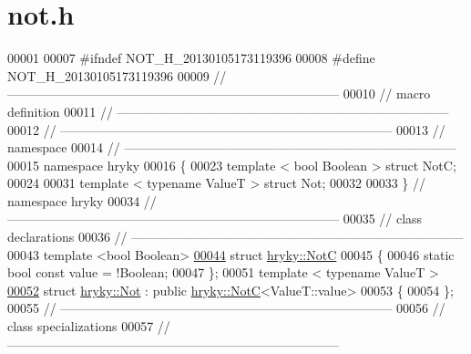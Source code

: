\hypertarget{not_8h_source}{\section{not.\-h}
}

\begin{DoxyCode}
00001 
00007 \textcolor{preprocessor}{#ifndef NOT\_H\_20130105173119396}
00008 \textcolor{preprocessor}{}\textcolor{preprocessor}{#define NOT\_H\_20130105173119396}
00009 \textcolor{preprocessor}{}\textcolor{comment}{//
      ------------------------------------------------------------------------------}
00010 \textcolor{comment}{// macro definition}
00011 \textcolor{comment}{//
      ------------------------------------------------------------------------------}
00012 \textcolor{comment}{//
      ------------------------------------------------------------------------------}
00013 \textcolor{comment}{// namespace}
00014 \textcolor{comment}{//
      ------------------------------------------------------------------------------}
00015 \textcolor{keyword}{namespace }hryky
00016 \{
00023     \textcolor{keyword}{template} < \textcolor{keywordtype}{bool} Boolean > \textcolor{keyword}{struct }NotC;
00024 
00031     \textcolor{keyword}{template} < \textcolor{keyword}{typename} ValueT > \textcolor{keyword}{struct }Not;
00032 
00033 \} \textcolor{comment}{// namespace hryky}
00034 \textcolor{comment}{//
      ------------------------------------------------------------------------------}
00035 \textcolor{comment}{// class declarations}
00036 \textcolor{comment}{//
      ------------------------------------------------------------------------------}
00043 \textcolor{comment}{}\textcolor{keyword}{template} <\textcolor{keywordtype}{bool} Boolean>
\hypertarget{not_8h_source_l00044}{}\hyperlink{structhryky_1_1_not_c}{00044} \textcolor{keyword}{struct }\hyperlink{structhryky_1_1_not_c}{hryky::NotC}
00045 \{
00046     \textcolor{keyword}{static} \textcolor{keywordtype}{bool} \textcolor{keyword}{const} value = !Boolean;
00047 \};
00051 \textcolor{keyword}{template} < \textcolor{keyword}{typename} ValueT >
\hypertarget{not_8h_source_l00052}{}\hyperlink{structhryky_1_1_not}{00052} \textcolor{keyword}{struct }\hyperlink{structhryky_1_1_not}{hryky::Not} : \textcolor{keyword}{public} \hyperlink{structhryky_1_1_not_c}{hryky::NotC}<ValueT::value>
00053 \{
00054 \};
00055 \textcolor{comment}{//
      ------------------------------------------------------------------------------}
00056 \textcolor{comment}{// class specializations}
00057 \textcolor{comment}{//
      ------------------------------------------------------------------------------}

\end{DoxyCode}
